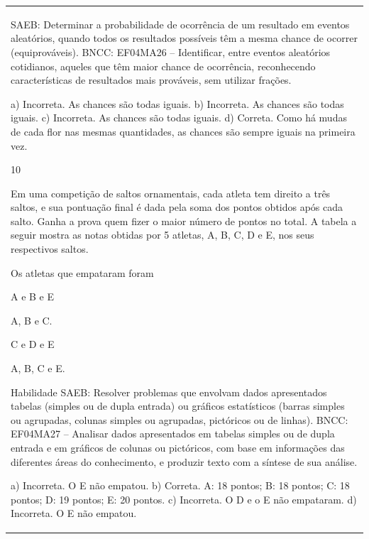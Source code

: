 \begin{mdframed}[linewidth=2pt,linecolor=salmao,roundcorner=2pt]
\begin{escolha}
{{{\begin{longtable}[]{@{}l@{}}
\begin{itemize}
{\begin{escolha}
SAEB: Determinar a probabilidade de ocorrência de um
resultado em eventos aleatórios, quando todos os resultados possíveis
têm a mesma chance de ocorrer (equiprováveis).
BNCC: EF04MA26 -- Identificar, entre eventos aleatórios cotidianos, aqueles que têm maior chance de
ocorrência, reconhecendo características de resultados mais prováveis, sem utilizar frações.

a) Incorreta. As chances são todas iguais.
b) Incorreta. As chances são todas iguais.
c) Incorreta. As chances são todas iguais.
d) Correta. Como há mudas de cada flor nas mesmas quantidades, as chances são sempre iguais na primeira vez.

\num{10}

Em uma competição de saltos ornamentais, cada atleta tem direito a três saltos,
e sua pontuação final é dada pela soma dos pontos obtidos após cada salto. Ganha a prova quem
fizer o maior número de pontos no total. A tabela a seguir mostra as notas obtidas por 5 atletas, A, B, C, D e E, nos seus respectivos saltos.




Os atletas que empataram foram

\begin{escolha}
\item
  A e B e E
\item
  A, B e C.
\item
  C e D e E
\item
  A, B, C e E.
\end{escolha}

Habilidade SAEB: Resolver problemas que envolvam dados apresentados tabelas (simples ou
de dupla entrada) ou gráficos estatísticos (barras simples ou agrupadas,
colunas simples ou agrupadas, pictóricos ou de linhas).
BNCC: EF04MA27 -- Analisar dados apresentados em tabelas simples ou de dupla entrada e em gráficos de
colunas ou pictóricos, com base em informações das diferentes áreas do conhecimento, e produzir
texto com a síntese de sua análise.

a) Incorreta. O E não empatou.
b) Correta. A: 18 pontos; B: 18 pontos; C: 18 pontos; D: 19 pontos; E: 20 pontos.
c) Incorreta. O D e o E não empataram.
d) Incorreta. O E não empatou.


\end{escolha}}
\end{itemize}
\end{longtable}}}}
\end{escolha}
\end{mdframed}
